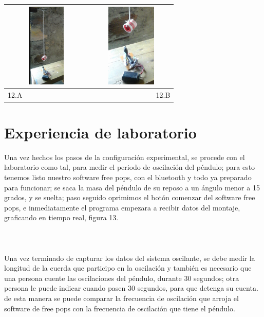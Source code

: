 \documentclass[12pt]{article}
\newenvironment{Figure}
{\par\medskip\noindent\minipage{\linewidth}}
{\endminipage\par\medskip}
\begin{document}
\begin{multicols}{2}
\begin{Figure}	
\center
\begin{tabular}{|l|r|}
\hline
\includegraphics[width=4cm, height=4cm]{fig/m_1.png} & \includegraphics[width=4cm, height=4cm]{fig/m_2.png} \\ \hline
12.A & 12.B \\ \hline
\end{tabular}
\label{fig:g12}
\end{Figure}

\section{Experiencia de laboratorio}
Una vez hechos los pasos de la configuración experimental, se procede con el laboratorio como tal, para medir el periodo de oscilación del péndulo; para esto tenemos listo nuestro software free pops, con el bluetooth y todo ya preparado para funcionar; se saca la masa del péndulo de su reposo a un ángulo menor a 15 grados, y se suelta; paso seguido oprimimos el botón comenzar del software free pops, e inmediatamente el programa empezara a recibir datos del montaje, graficando en tiempo real, figura 13.
\\ \\ \\ \\
Una vez terminado de capturar los datos del sistema oscilante,  se debe medir la longitud de la cuerda que participo en la oscilación y también es necesario que una persona cuente las oscilaciones del péndulo, durante 30 segundos; otra persona le puede indicar cuando pasen 30 segundos, para que detenga su cuenta. de esta manera se puede comparar la frecuencia de oscilación  que arroja el software de free pops con la frecuencia de oscilación que tiene el péndulo.


\end{multicols}
\end{document}
